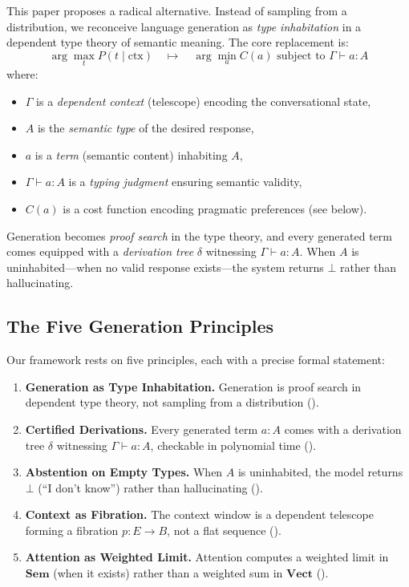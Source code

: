 \documentclass[11pt,a4paper]{article}
\theoremstyle{plain}
\theoremstyle{definition}
\theoremstyle{remark}
\newcommand{\Sem}{\mathbf{Sem}}
\newcommand{\Vect}{\mathbf{Vect}}
\begin{document}
This paper proposes a radical alternative.
Instead of sampling from a distribution, we reconceive language generation as \emph{type inhabitation} in a dependent type theory of semantic meaning.
The core replacement is:
\begin{equation}\label{eq:type-gen}
  \arg\max_t P(t \mid \mathrm{ctx}) \quad\longmapsto\quad \arg\min_a C(a) \text{ subject to } \Gamma \vdash a : A
\end{equation}
where:
\begin{itemize}[nosep]
  \item $\Gamma$ is a \emph{dependent context} (telescope) encoding the conversational state,
  \item $A$ is the \emph{semantic type} of the desired response,
  \item $a$ is a \emph{term} (semantic content) inhabiting $A$,
  \item $\Gamma \vdash a : A$ is a \emph{typing judgment} ensuring semantic validity,
  \item $C(a)$ is a cost function encoding pragmatic preferences (see  below).
\end{itemize}
Generation becomes \emph{proof search} in the type theory, and every generated term comes equipped with a \emph{derivation tree} $\delta$ witnessing $\Gamma \vdash a : A$.
When $A$ is uninhabited---when no valid response exists---the system returns $\bot$ rather than hallucinating.

\subsection{The Five Generation Principles}

Our framework rests on five principles, each with a precise formal statement:

\begin{enumerate}[label=\textbf{P\arabic*.},nosep]
  \item \textbf{Generation as Type Inhabitation.} Generation is proof search in dependent type theory, not sampling from a distribution ().
  \item \textbf{Certified Derivations.} Every generated term $a : A$ comes with a derivation tree $\delta$ witnessing $\Gamma \vdash a : A$, checkable in polynomial time ().
  \item \textbf{Abstention on Empty Types.} When $A$ is uninhabited, the model returns $\bot$ (``I don't know'') rather than hallucinating ().
  \item \textbf{Context as Fibration.} The context window is a dependent telescope forming a fibration $p : E \to B$, not a flat sequence ().
  \item \textbf{Attention as Weighted Limit.} Attention computes a weighted limit in $\Sem$ (when it exists) rather than a weighted sum in $\Vect$ ().
\end{enumerate}
\end{document}
